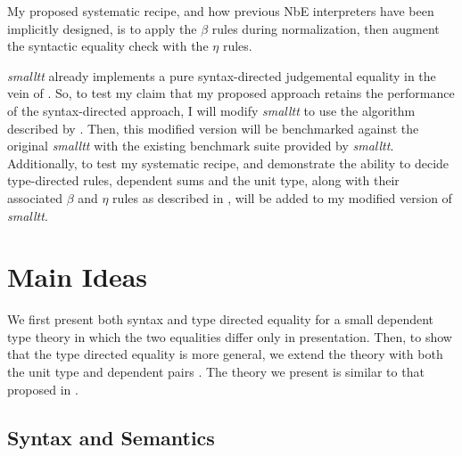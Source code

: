 \documentclass{article}
\begin{document}
\begin{mathpar}
\end{mathpar}

My proposed systematic recipe, and how previous NbE interpreters have been implicitly designed, is to apply the $\beta$ rules during normalization, then augment the syntactic equality check with the $\eta$ rules.

\hfill\break

\textit{smalltt} already implements a pure syntax-directed judgemental equality in the vein of \citet{Coquand1996}.
So, to test my claim that my proposed approach retains the performance of the syntax-directed approach, I will modify \textit{smalltt} to use the algorithm described by \citet{Chapman2005}.
Then, this modified version will be benchmarked against the original \textit{smalltt} with the existing benchmark suite provided by \textit{smalltt}.
Additionally, to test my systematic recipe, and demonstrate the ability to decide type-directed rules, dependent sums and the unit type, along with their associated $\beta$ and $\eta$ rules as described in \citet{Chapman2005}, will be added to my modified version of \textit{smalltt}.

\section{Main Ideas}

We first present both syntax and type directed equality for a small dependent type theory in which the two equalities differ only in presentation.
Then, to show that the type directed equality is more general, we extend the theory with both the unit type and dependent pairs .
The theory we present is similar to that proposed in \citet{altenkirch2010}.

\subsection{Syntax and Semantics}
\end{document}
